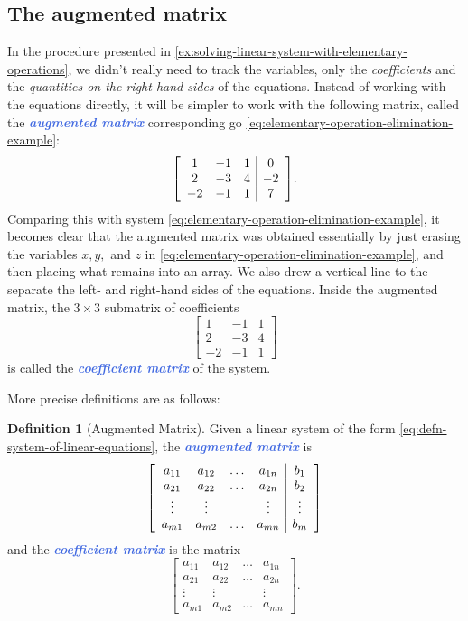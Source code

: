 \documentclass[10pt]{article}
\newcommand{\demph}[1]{\textcolor{RoyalBlue}{\textbf{\slshape #1}}} %
\newenvironment{augmentedmatrix}[1] %
{\left[\begin{array}{#1}}
    {\end{array}\right]}
\theoremstyle{definition}
\newtheorem{definition}[theorem]{Definition}
\begin{document}
\subsection{The augmented matrix}
In the procedure presented in
\cref{ex:solving-linear-system-with-elementary-operations}, we didn't really
need to track the variables, only the \textit{coefficients} and the
\textit{quantities on the right hand sides} of the equations. Instead of
working with the equations directly, it will be simpler to work with the
following matrix, called the \demph{augmented matrix} corresponding go
\cref{eq:elementary-operation-elimination-example}:
\begin{equation*}
  \begin{augmentedmatrix}{ccc|c}
    1& -1& 1& 0 \\
    2& -3& 4& -2 \\
    -2& -1& 1& 7
  \end{augmentedmatrix}.
\end{equation*}
Comparing this with system \eqref{eq:elementary-operation-elimination-example}, it becomes
clear that the augmented matrix was obtained essentially by just erasing the
variables $x,y,$ and $z$ in \eqref{eq:elementary-operation-elimination-example}, and
then placing what remains into an array. We also drew a vertical line to the
separate the left- and right-hand sides of the equations. Inside the augmented
matrix, the $3\times 3$ submatrix  of coefficients
\begin{equation*}
  \begin{bmatrix}
    1& -1& 1\\
    2& -3& 4\\
    -2& -1& 1
  \end{bmatrix}
\end{equation*}
is called the \demph{coefficient matrix} of the system. 

More precise definitions are as follows:

\begin{definition}[Augmented Matrix]
  Given a linear system of the form \eqref{eq:defn-system-of-linear-equations},
  the \demph{augmented matrix} is
  \begin{equation*}
    \begin{augmentedmatrix}{cccc|c}
      a_{11}&a_{12}&\ldots& a_{1n}& b_{1}\\
      a_{21}&a_{22}&\ldots& a_{2n}& b_{2}\\
      \vdots &\vdots & &\vdots &\vdots \\
      a_{m1}&a_{m2}&\ldots& a_{mn}& b_{m}
    \end{augmentedmatrix}
  \end{equation*}
  and the \demph{coefficient matrix} is the matrix
  \begin{equation*}
    \begin{bmatrix}
      a_{11}&a_{12}&\ldots& a_{1n}\\
      a_{21}&a_{22}&\ldots& a_{2n}\\
      \vdots&\vdots & &\vdots \\
      a_{m1}&a_{m2}&\ldots& a_{mn}
    \end{bmatrix}.
  \end{equation*}
\end{definition}
\end{document}
